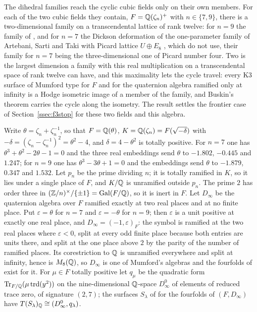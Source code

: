The dihedral families reach the cyclic cubic fields only on their own members. For each of the two cubic fields they contain, $F=\mathbb{Q}(\zeta_{n})^{+}$ with $n\in\{7,9\}$, there is a two-dimensional family on a transcendental lattice of rank twelve: for $n=9$ the family of \cite[\S5.6]{vGS25}, and for $n=7$ the Dickson deformation of the one-parameter family of Artebani, Sarti and Taki with Picard lattice $U\oplus E_{8}$ \cite[Ex.~6.1]{AST11}, which \cite{vGS25} do not use, their family for $n=7$ being the three-dimensional one of Picard number four. Two is the largest dimension a family with this real multiplication on a transcendental space of rank twelve can have, and this maximality lets the cycle travel: every K3 surface of Mumford type for $F$ and for the quaternion algebra ramified only at infinity is a Hodge isometric image of a member of the family, and Buskin's theorem carries the cycle along the isometry. The result settles the frontier case of Section~\ref{ssec:f3stop} for these two fields and this algebra.

Write $\theta=\zeta_{n}+\zeta_{n}^{-1}$, so that $F=\mathbb{Q}(\theta)$, $K=\mathbb{Q}(\zeta_{n})=F(\sqrt{-\delta})$ with $-\delta=(\zeta_{n}-\zeta_{n}^{-1})^{2}=\theta^{2}-4$, and $\delta=4-\theta^{2}$ is totally positive. For $n=7$ one has $\theta^{3}+\theta^{2}-2\theta-1=0$ and the three real embeddings send $\theta$ to $-1.802$, $-0.445$ and $1.247$; for $n=9$ one has $\theta^{3}-3\theta+1=0$ and the embeddings send $\theta$ to $-1.879$, $0.347$ and $1.532$. Let $p_{n}$ be the prime dividing $n$; it is totally ramified in $K$, so it lies under a single place of $F$, and $K/\mathbb{Q}$ is unramified outside $p_{n}$. The prime $2$ has order three in $(\mathbb{Z}/n)^{\times}/\{\pm1\}=\mathrm{Gal}(F/\mathbb{Q})$, so it is inert in $F$. Let $D_{\infty}$ be the quaternion algebra over $F$ ramified exactly at two real places and at no finite place. Put $\varepsilon=\theta$ for $n=7$ and $\varepsilon=-\theta$ for $n=9$; then $\varepsilon$ is a unit positive at exactly one real place, and $D_{\infty}=(-1,\varepsilon)_{F}$: the symbol is ramified at the two real places where $\varepsilon<0$, split at every odd finite place because both entries are units there, and split at the one place above $2$ by the parity of the number of ramified places. Its corestriction to $\mathbb{Q}$ is unramified everywhere and split at infinity, hence is $M_{8}(\mathbb{Q})$, so $D_{\infty}$ is one of Mumford's algebras and the fourfolds of \cite{Mum69} exist for it. For $\mu\in F$ totally positive let $q_{\mu}$ be the quadratic form $\mathrm{Tr}_{F/\mathbb{Q}}(\mu\,\mathrm{trd}(y^{2}))$ on the nine-dimensional $\mathbb{Q}$-space $D_{\infty}^{0}$ of elements of reduced trace zero, of signature $(2,7)$; the surfaces $S_{\lambda}$ of \cite[Thm.~21.4]{BMB26} for the fourfolds of $(F,D_{\infty})$ have $T(S_{\lambda})_{\mathbb{Q}}\cong(D_{\infty}^{0},q_{\lambda})$.

